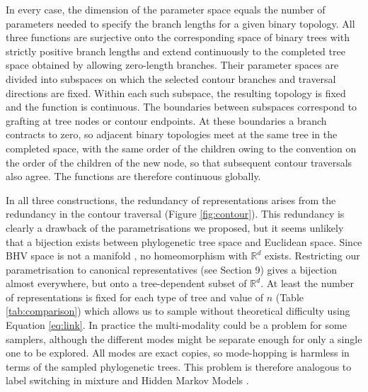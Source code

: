 \documentclass{article}
\begin{document}
In every case, the dimension of the parameter space equals
the number of parameters needed to specify the branch lengths for a given binary topology. 
All three functions are surjective onto the corresponding space of binary
trees with strictly positive branch lengths and extend continuously to
the completed tree space obtained by allowing zero-length branches. Their
parameter spaces are divided into subspaces on which the
selected contour branches and traversal directions are fixed. Within
each such subspace, the resulting topology is fixed and the function is continuous.
The boundaries between subspaces correspond to grafting at tree nodes or
contour endpoints. 
At these boundaries a branch contracts to zero, so adjacent binary topologies
meet at the same tree in the completed space, with the same order of the
children owing to the convention on the order of the children of the new node,
so that subsequent contour traversals also agree. The functions are therefore
continuous globally.

In all three constructions, the redundancy of representations arises from the redundancy in
the contour traversal (Figure \ref{fig:contour}). 
This redundancy is clearly a drawback of the parametrisations we proposed,
but it seems unlikely that a bijection exists between phylogenetic tree
space and Euclidean space.
Since BHV space is not a manifold \citep{Billera2001}, 
no homeomorphism with $\mathbb{R}^d$ exists. 
Restricting our parametrisation to canonical representatives (see Section 9) gives a bijection 
almost everywhere, but onto a tree-dependent subset of $\mathbb{R}^d$.
At least the number of representations is fixed for
each type of tree and value of $n$ (Table \ref{tab:comparison}) which
allows us to sample without theoretical difficulty using Equation \ref{eq:link}. 
In practice the multi-modality
could be a problem for some samplers, although the different modes might be 
separate enough for only a single one to be explored. 
All modes are exact copies, so mode-hopping is harmless 
in terms of the sampled phylogenetic trees.
This problem is therefore analogous to label switching in mixture and
Hidden Markov Models \citep{papastamoulisLabelswitchingPackageDealing2016}.
\end{document}

